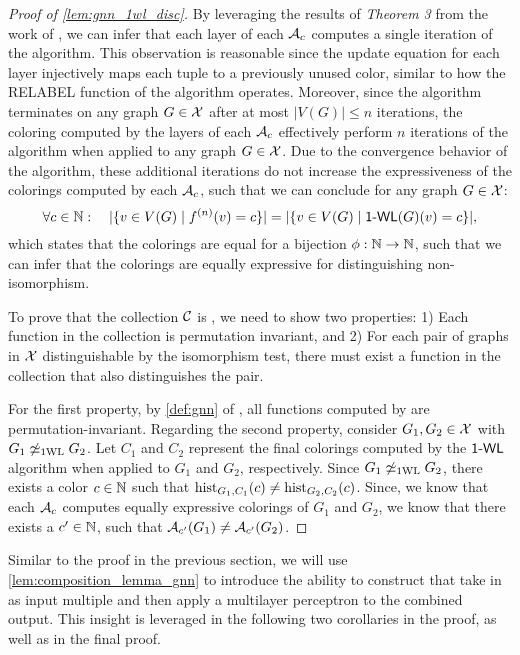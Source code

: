 \begin{proof}[Proof of \cref{lem:gnn_1wl_disc}]
    By leveraging the results of \textit{Theorem 3} from the work of \cite{Xu2018}, we can infer that each layer of each $\mathcal{A}_c$ computes a single iteration of the \wl algorithm. This observation is reasonable since the update equation for each layer injectively maps each tuple to a previously unused color, similar to how the \textsf{RELABEL} function of the \wl algorithm operates. Moreover, since the \wl algorithm terminates on any graph $G \in \mathcal{X}$ after at most $|V(G)| \leq n$ iterations, the coloring computed by the layers of each $\mathcal{A}_c$ effectively perform $n$ iterations of the \wl algorithm when applied to any graph $G \in \mathcal{X}$. Due to the convergence behavior of the \wl algorithm, these additional iterations do not increase the expressiveness of the colorings computed by each $\mathcal{A}_c$, such that we can conclude for any graph $G \in \mathcal{X}$:
    \begin{equation*}
       \forall c \in \mathbb{N}: \quad |\{ v \in V(G) \mid  f^{(n)}(v) = c \}| = |\{ v \in V(G) \mid  \textsf{1-WL}(G)(v) = c \}|,
    \end{equation*}
    which states that the colorings are equal for a bijection $\phi : \mathbb{N} \rightarrow \mathbb{N}$, such that we can infer that the colorings are equally expressive for distinguishing non-isomorphism.

    To prove that the collection $\mathcal{C}$ is \wldisc, we need to show two properties: 1) Each function in the collection is permutation invariant, and 2) For each pair of graphs in $\mathcal{X}$ distinguishable by the \wl isomorphism test, there must exist a function in the collection that also distinguishes the pair.
   
    For the first property, by \cref{def:gnn} of \gnns, all functions computed by \gnns are permutation-invariant.
    Regarding the second property, consider $G_1, G_2 \in \mathcal{X}$ with $G_1 \not\simeq_{\text{1WL}} G_2$. Let $C_1$ and $C_2$ represent the final colorings computed by the $\textsf{1-WL}$ algorithm when applied to $G_1$ and $G_2$, respectively. Since $G_1 \not\simeq_{\text{1WL}} G_2$, there exists a color $c \in \mathbb{N}$ such that $\operatorname{hist}_{G_1,C_1}(c) \neq \operatorname{hist}_{G_2,C_2}(c)$. Since, we know that each $\mathcal{A}_c$ computes equally expressive colorings of $G_1$ and $G_2$, we know that there exists a $c' \in \mathbb{N}$, such that $\mathcal{A}_{c'}(G_1) \neq \mathcal{A}_{c'}(G_2)$.
\end{proof}
 
Similar to the proof in the previous section, we will use \cref{lem:composition_lemma_gnn} to introduce the ability to construct \gnns that take in as input multiple \gnns and then apply a multilayer perceptron to the combined output. This insight is leveraged in the following two corollaries in the proof, as well as in the final proof.

